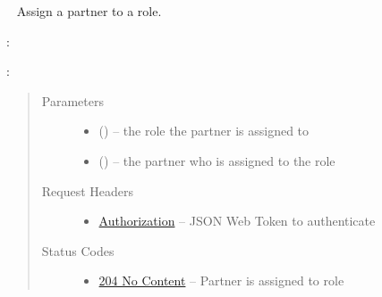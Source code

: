 \documentclass[letterpaper,10pt,english]{sphinxmanual}
\begin{document}
\begin{fulllineitems}
\label{\detokenize{resources/role:put--roles-(role_id)-members-(partner_id)}}~
Assign a partner to a role.

:

\begin{sphinxVerbatim}[commandchars=\\\{\}]
  
 
 
\end{sphinxVerbatim}

:

\begin{sphinxVerbatim}[commandchars=\\\{\}]
  
\end{sphinxVerbatim}
\begin{quote}\begin{description}
\item[{Parameters}] \leavevmode\begin{itemize}
\item {} 
 () -- the role the partner is assigned to

\item {} 
 () -- the partner who is assigned to the role

\end{itemize}

\item[{Request Headers}] \leavevmode\begin{itemize}
\item {} 
\href{http://tools.ietf.org/html/rfc7235\#section-4.2}{Authorization} -- JSON Web Token to authenticate

\end{itemize}

\item[{Status Codes}] \leavevmode\begin{itemize}
\item {} 
\href{http://www.w3.org/Protocols/rfc2616/rfc2616-sec10.html\#sec10.2.5}{204 No Content} -- Partner is assigned to role


\end{itemize}
\end{description}
\end{quote}
\end{fulllineitems}
\end{document}
